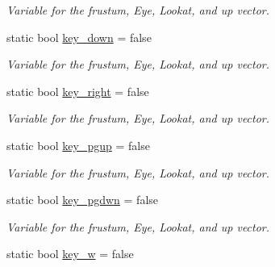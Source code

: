 \begin{DoxyCompactItemize}
\begin{DoxyCompactList}\small\item\em Variable for the frustum, Eye, Lookat, and up vector. \end{DoxyCompactList}\item 
static bool \hyperlink{classcft_1_1Scene_ad75fc941a38b667bc3a4d6ba0b29f45d}{key\+\_\+down} = false\hypertarget{classcft_1_1Scene_ad75fc941a38b667bc3a4d6ba0b29f45d}{}\label{classcft_1_1Scene_ad75fc941a38b667bc3a4d6ba0b29f45d}

\begin{DoxyCompactList}\small\item\em Variable for the frustum, Eye, Lookat, and up vector. \end{DoxyCompactList}\item 
static bool \hyperlink{classcft_1_1Scene_a1d10514cd72380e1291cfb5a8ec05b24}{key\+\_\+right} = false\hypertarget{classcft_1_1Scene_a1d10514cd72380e1291cfb5a8ec05b24}{}\label{classcft_1_1Scene_a1d10514cd72380e1291cfb5a8ec05b24}

\begin{DoxyCompactList}\small\item\em Variable for the frustum, Eye, Lookat, and up vector. \end{DoxyCompactList}\item 
static bool \hyperlink{classcft_1_1Scene_a8fb47f7100d06af74f36b2b8c23f7a65}{key\+\_\+pgup} = false\hypertarget{classcft_1_1Scene_a8fb47f7100d06af74f36b2b8c23f7a65}{}\label{classcft_1_1Scene_a8fb47f7100d06af74f36b2b8c23f7a65}

\begin{DoxyCompactList}\small\item\em Variable for the frustum, Eye, Lookat, and up vector. \end{DoxyCompactList}\item 
static bool \hyperlink{classcft_1_1Scene_a003d215e69a801c3ef7a57c88bada0d7}{key\+\_\+pgdwn} = false\hypertarget{classcft_1_1Scene_a003d215e69a801c3ef7a57c88bada0d7}{}\label{classcft_1_1Scene_a003d215e69a801c3ef7a57c88bada0d7}

\begin{DoxyCompactList}\small\item\em Variable for the frustum, Eye, Lookat, and up vector. \end{DoxyCompactList}\item 
static bool \hyperlink{classcft_1_1Scene_a8ad6e3c1f0836e1d581d91533e74807d}{key\+\_\+w} = false\hypertarget{classcft_1_1Scene_a8ad6e3c1f0836e1d581d91533e74807d}{}\label{classcft_1_1Scene_a8ad6e3c1f0836e1d581d91533e74807d}


\end{DoxyCompactItemize}
